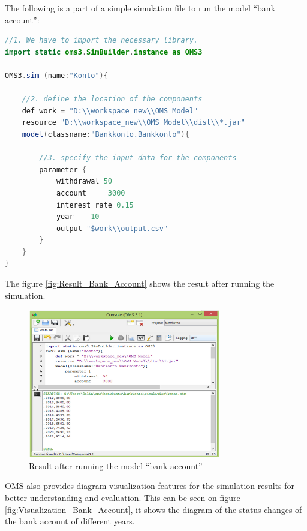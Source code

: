 \par
The following is a part of a simple simulation file to run the model “bank account”:
\begin{lstlisting}[language=Java]
//1. We have to import the necessary library.
import static oms3.SimBuilder.instance as OMS3

OMS3.sim (name:"Konto"){

	//2. define the location of the components
	def work = "D:\\workspace_new\\OMS Model"
	resource "D:\\workspace_new\\OMS Model\\dist\\*.jar"
	model(classname:"Bankkonto.Bankkonto"){

		//3. specify the input data for the components
		parameter {
			withdrawal 50
			account 	3000
			interest_rate 0.15
			year 	10
			output "$work\\output.csv"
		}
	}
}
\end{lstlisting}
\par
The figure \vref{fig:Result_Bank_Account} shows the result after running the simulation.
\begin{figure}[htbp]
	\centering
	\includegraphics[width=0.75\textwidth]{pics/oms/Figure9.png}
	\caption{Result after running the model “bank account”
 \label{fig:Result_Bank_Account}}	
\end{figure}
OMS also provides diagram visualization features for the simulation results for better understanding and evaluation. This can be seen on figure \ref{fig:Visualization_Bank_Account}, it shows the diagram of the status changes of the bank account of different years.

